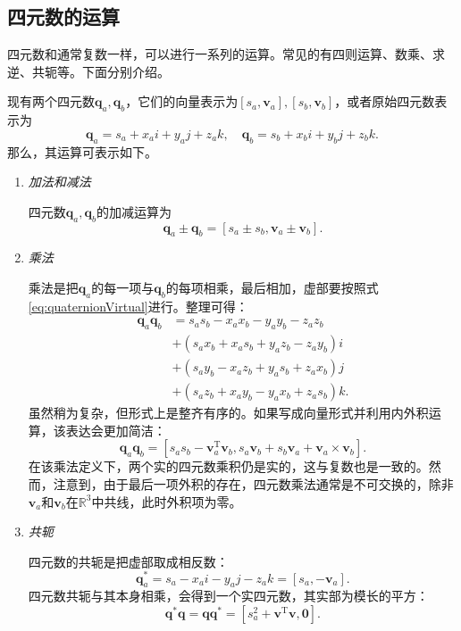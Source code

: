 \subsection{四元数的运算}
四元数和通常复数一样，可以进行一系列的运算。常见的有四则运算、数乘、求逆、共轭等。下面分别介绍。

现有两个四元数$\bm{q}_a, \bm{q}_b$，它们的向量表示为$[s_a, \bm{v}_a], [s_b, \bm{v}_b]$，或者原始四元数表示为
\[
\bm{q}_a = s_a+x_ai+y_aj+z_ak, \quad \bm{q}_b  = s_b+x_bi+y_bj+z_bk.
\]
那么，其运算可表示如下。

\begin{enumerate}
	\item {\emph{加法和减法}}
	
	四元数$\bm{q}_a, \bm{q}_b$的加减运算为
	\begin{equation} 	
	\bm{q}_a \pm \bm{q}_b = \left[ s_a \pm s_b, \bm{v}_a \pm \bm{v}_b \right].
	\end{equation}
	\item{\emph{乘法}}
	
	乘法是把$\bm{q}_a$的每一项与$\bm{q}_b$的每项相乘，最后相加，虚部要按照式\eqref{eq:quaternionVirtual}进行。整理可得：
	\begin{equation}
	\begin{aligned}
	\bm{q}_a \bm{q}_b &= {s_a}{s_b} - {x_a}{x_b} - {y_a}{y_b} - {z_a}{z_b}\\
	&+ \left( {{s_a}{x_b} + {x_a}{s_b} + {y_a}{z_b} - {z_a}{y_b}} \right)i\\
	&+ \left( {{s_a}{y_b} - {x_a}{z_b} + {y_a}{s_b} + {z_a}{x_b}} \right)j\\
	&+ \left( {{s_a}{z_b} + {x_a}{y_b} - {y_a}{x_b} + {z_a}{s_b}} \right)k.
	\end{aligned}
	\end{equation}
	虽然稍为复杂，但形式上是整齐有序的。如果写成向量形式并利用内外积运算，该表达会更加简洁：
	\begin{equation}
	\bm{q}_a \bm{q}_b = \left[ s_a s_b - \bm{v}_a^\mathrm{T} \bm{v}_b, s_a\bm{v}_b + s_b\bm{v}_a + \bm{v}_a \times \bm{v}_b \right].
	\end{equation}
	在该乘法定义下，两个实的四元数乘积仍是实的，这与复数也是一致的。然而，注意到，由于最后一项外积的存在，四元数乘法通常是不可交换的，除非$\bm{v}_a$和$\bm{v}_b$在$\mathbb{R}^3$中共线，此时外积项为零。

\clearpage	
	\item { \emph{共轭} }
	
	四元数的共轭是把虚部取成相反数：
	\begin{equation}
	\bm{q}_a^* = s_a - x_ai - y_aj - z_ak = [s_a, -\bm{v}_a].
	\end{equation}
	四元数共轭与其本身相乘，会得到一个实四元数，其实部为模长的平方：
	\begin{equation}
	\bm{q}^* \bm{q} = \bm{q} \bm{q}^* = [s_a^2+\bm{v}^\mathrm{T} \bm{v}, \bm{0} ].
	\end{equation}
	

\end{enumerate}
